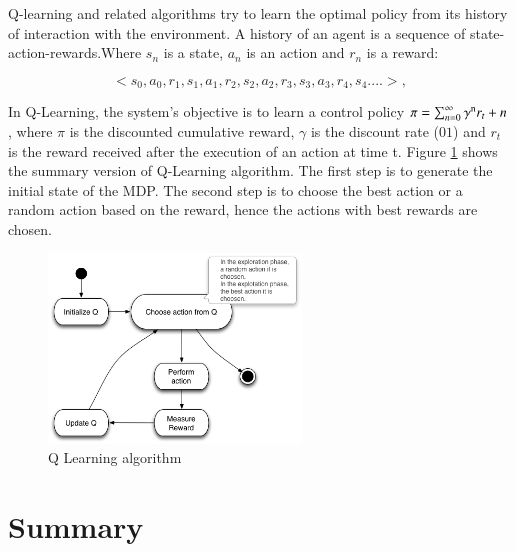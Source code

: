\documentclass[espaco=umemeio,chapter=TITLE,twoside,openright]{abnt}
\begin{document}
Q-learning and related algorithms try to learn the optimal policy from its history of interaction with the environment. A history of an agent is a sequence of state-action-rewards.Where $s_{n}$ is a state, $a_{n}$ is an action and $r_{n}$ is a reward:

\begin{equation}
<s_{0},a_{0},r_{1},s_{1},a_{1},r_{2},s_{2},a_{2},r_{3},s_{3},a_{3},r_{4},s_{4}....>,
\end{equation}


In Q-Learning, the system's objective is to learn a control policy $\pi = \sum_{n=0}^{\infty} \gamma\textsuperscript{n}  r_{t}+n $, where $\pi$  is the discounted cumulative reward, $\gamma$ is the discount rate ($01$) and $r_{t}$ is the reward received after  the execution of an action at time t. Figure \ref{fig:qalgo} shows the summary version of Q-Learning algorithm. The first step is to generate the initial state of the MDP. The second step is to choose the best action or a random action based on the reward, hence the actions with best rewards are chosen.

\begin{figure}[h]
\centering
\includegraphics[width=0.6\textwidth]{./images/qalgo.png}
\caption{Q Learning algorithm}
\label{fig:qalgo}
\end{figure}

\section{Summary}
\end{document}
